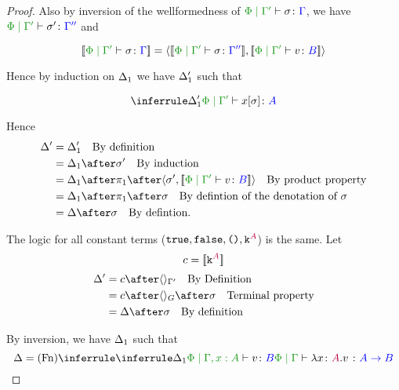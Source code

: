 \documentclass{report}
\begin{document}
\begin{framed}
\begin{proof}
        Also by inversion of the wellformedness of $\etyperelation{\P}{\G'}{\si}{\G}$, we have $\etyperelation{\P}{\G'}{\si'}{\G''}$ and 
        
        \begin{equation}
            \deno{\etyperelation{\P}{\G'}{\si}{\G}} = \pr{\deno{\etyperelation{\P}{\G'}{\si}{\G''}}}{\deno{\etyperelation{\P}{\G'}{v}{B}}}
        \end{equation}
        
        Hence by induction on $\Delta_1$ we have $\Delta_1'$ such that
        
        \begin{equation}
            \treeruleI{\D_1'}{\etyperelation{\P}{\G'}{x\ssi}{A}}
        \end{equation}
        
        
        
        Hence
        \begin{align*}
            \D' & = \D_1' \qt{By definition}\\
                & = \D_1\after\si'\qt{By induction}\\
                & = \D_1\after\p\after\pr{\si'}{\deno{\etyperelation{\P}{\G'}{v}{B}}}\qt{By product property}\\
                & = \D_1\after\p\after\si\qt{By defintion of the denotation of $\si$}\\
                & = \D\after\si\qt{By defintion.}
        \end{align*}
        
        \case{\vconst}
        The logic for all constant terms ($\texttt{true},\texttt{false},\texttt{()},\texttt{k}^{\color{purple} A}$) is the same.
        Let
        \begin{equation}
            c = {\bf [\![}\texttt{k}^{\color{purple} A}{\bf ]\!]}
        \end{equation}
        \begin{align*}
            \D' & = c\after\term{\G'}\qt{By Definition}\\
                & = c\after\term{G}\after\si\qt{Terminal property}\\
                & = \D\after\si\qt{By definition}
        \end{align*}
        
        
        \case{\vfun}
        
        By inversion, we have $\Delta_1$ such that
        \begin{equation}
            \D = \ntreeruleI{\vfun}{
                \treeruleI{\D_1}{\etyperelation{\P}{\G, x:A}{v}{B}}
            }{\etyperelation{\P}{\G}{\lam{x}{A}{v}}{\ab}}
        \end{equation}
        

\end{proof}
\end{framed}
\end{document}
